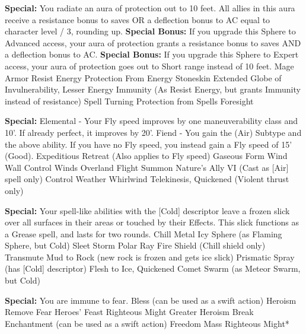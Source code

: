 \begin{multicols}{2}

\textbf{Special: }{You radiate an aura of protection out to 10 feet. All allies in this aura receive a resistance bonus to saves OR a deflection bonus to AC equal to character level / 3, rounding up.}
\newline\textbf{Special Bonus: }{If you upgrade this Sphere to Advanced access, your aura of protection grants a resistance bonus to saves AND a deflection bonus to AC.}
\newline\textbf{Special Bonus: }{If you upgrade this Sphere to Expert access, your aura of protection goes out to Short range instead of 10 feet.}
\sphere
{Mage Armor}
{Resist Energy}
{Protection From Energy}
{Stoneskin}
{Extended Globe of Invulnerability, Lesser}
{Energy Immunity (As Resist Energy, but grants Immunity instead of resistance)}
{Spell Turning}
{Protection from Spells}
{Foresight}

\textbf{Special: }{Elemental - Your Fly speed improves by one maneuverability class and 10'. If already perfect, it improves by 20'. Fiend - You gain the (Air) Subtype and the above ability. If you have no Fly speed, you instead gain a Fly speed of 15' (Good).}
\sphere
{Expeditious Retreat (Also applies to Fly speed)}
{Gaseous Form}
{Wind Wall}
{Control Winds}
{Overland Flight}
{Summon Nature's Ally VI (Cast as [Air] spell only)}
{Control Weather}
{Whirlwind}
{Telekinesis, Quickened (Violent thrust only)}

\textbf{Special: }{Your spell-like abilities with the [Cold] descriptor leave a frozen slick over all surfaces in their areas or touched by their Effects. This slick functions as a Grease spell, and lasts for two rounds.}
\sphere
{Chill Metal}
{Icy Sphere (as Flaming Sphere, but Cold)}
{Sleet Storm}
{Polar Ray}
{Fire Shield (Chill shield only)}
{Transmute Mud to Rock (new rock is frozen and gets ice slick)}
{Prismatic Spray (has [Cold] descriptor)}
{Flesh to Ice, Quickened}
{Comet Swarm (as Meteor Swarm, but Cold)}

\textbf{Special: }{You are immune to fear.}
\sphere
{Bless (can be used as a swift action)}
{Heroism}
{Remove Fear}
{Heroes' Feast}
{Righteous Might}
{Greater Heroism}
{Break Enchantment (can be used as a swift action)}
{Freedom}
{Mass Righteous Might*}


\end{multicols}
